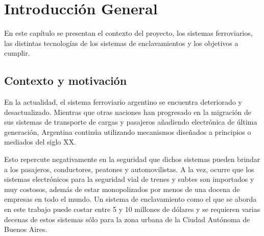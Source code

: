 
\chapter{Introducción General} %

\label{Chapter1} %
\label{IntroGeneral}


\newcommand{\keyword}[1]{\textbf{#1}}
\newcommand{\tabhead}[1]{\textbf{#1}}
\newcommand{\code}[1]{\texttt{#1}}
\newcommand{\file}[1]{\texttt{\bfseries#1}}
\newcommand{\option}[1]{\texttt{\itshape#1}}
\newcommand{\grados}{$^{\circ}$}


En este capítulo se presentan el contexto del proyecto, los sistemas ferroviarios, las distintas tecnologías de los sistemas de enclavamientos y los objetivos a cumplir.

		
	\section{Contexto y motivación}
	
		En la actualidad, el sistema ferroviario argentino se encuentra deteriorado y desactualizado. Mientras que otras naciones han progresado en la migración de sus sistemas de transporte de cargas y pasajeros añadiendo electrónica de última generación, Argentina continúa utilizando mecanismos diseñados a principios o mediados del siglo XX.
				
		Esto repercute negativamente en la seguridad que dichos sistemas pueden brindar a los pasajeros, conductores, peatones y automovilistas. A la vez, ocurre que los sistemas electrónicos para la seguridad vial de trenes y subtes son importados y muy costosos, además de estar monopolizados por menos de una docena de empresas en todo el mundo. Un sistema de enclavamiento como el que se aborda en este trabajo puede costar entre 5 y 10 millones de dólares\citep{SIEMENS} y se requieren varias decenas de estos sistemas sólo para la zona urbana de la Ciudad Autónoma de Buenos Aires.
		
